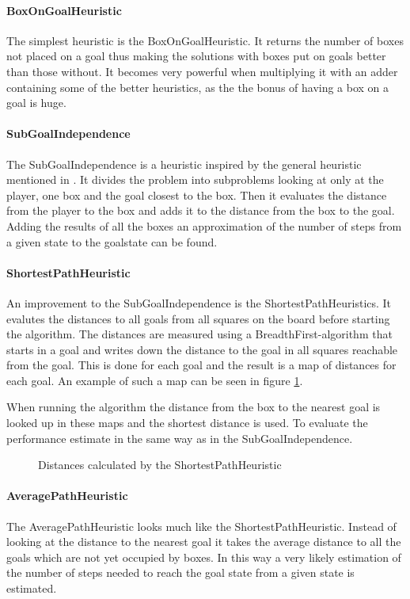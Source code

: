 \paragraph{BoxOnGoalHeuristic}The simplest heuristic is the BoxOnGoalHeuristic. It returns the number of boxes not placed on a goal thus making the solutions with boxes put on goals better than those without. It becomes very powerful when multiplying it with an adder containing some of the better heuristics, as the the bonus of having a box on a goal is huge.

\paragraph{SubGoalIndependence}The SubGoalIndependence is a heuristic inspired by the general heuristic mentioned in \citet{Russell2003GeneralHeuristics}. It divides the problem into subproblems looking at only at the player, one box and the goal closest to the box. Then it evaluates the distance from the player to the box and adds it to the distance from the box to the goal. Adding the results of all the boxes an approximation of the number of steps from a given state to the goalstate can be found.

\paragraph{ShortestPathHeuristic}An improvement to the SubGoalIndependence is the ShortestPathHeuristics. It evalutes the distances to all goals from all squares on the board before starting the \astar algorithm. The distances are measured using a BreadthFirst-algorithm that starts in a goal and writes down the distance to the goal in all squares reachable from the goal. This is done for each goal and the result is a map of distances for each goal. An example of such a map can be seen in figure \ref{fig:shortestpathheuristic}.

When running the algorithm the distance from the box to the nearest goal is looked up in these maps and the shortest distance is used. To evaluate the performance estimate in the same way as in the SubGoalIndependence.
\begin{figure}[htp]
	\centering
	\caption{Distances calculated by the ShortestPathHeuristic}
	\label{fig:shortestpathheuristic}
\end{figure}

\paragraph{AveragePathHeuristic}The AveragePathHeuristic looks much like the ShortestPathHeuristic. Instead of looking at the distance to the nearest goal it takes the average distance to all the goals which are not yet occupied by boxes. In this way a very likely estimation of the number of steps needed to reach the goal state from a given state is estimated.

